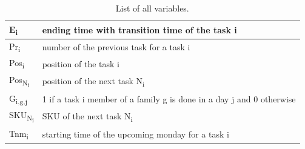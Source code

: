 \documentclass[fleqn,10pt]{wlscirep}
\begin{document}
\begin{table}[ht]
\begin{tabular}{|l|l|}
\hline
E\textsubscript{i}  & ending time with transition time of the task i \\
\hline
Pr\textsubscript{i}  & number of the previous task for a task i \\
\hline
Pos\textsubscript{i}  & position of the task i \\
\hline
Pos\textsubscript{N\textsubscript{i}}  & position of the next task N\textsubscript{i} \\
\hline
G\textsubscript{i,g,j} & 1 if a task i member of a family g is done in a day j and 0 otherwise\\
\hline
SKU\textsubscript{N\textsubscript{i}} & SKU of the next task {N\textsubscript{i}} \\
\hline
Tnm\textsubscript{i} & starting time of the upcoming monday for a task i \\
\hline
\end{tabular}
\caption{\label{tab:example}List of all variables.}
\end{table}
\end{document}
